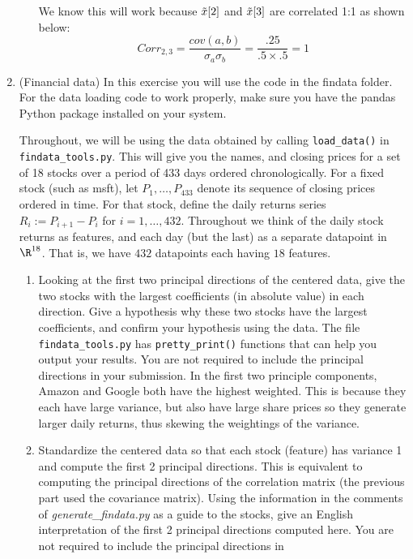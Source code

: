 \documentclass[12pt,twoside]{article}
\newcommand{\rx}{\rnd{ x}  }
\newcommand{\rnd}{\Tilde}
\begin{document}
\begin{enumerate}
\begin{enumerate}
We know this will work because $\rx[2]$ and $\rx[3]$ are correlated 1:1 as shown below:
$$
    Corr_{2,3} = \frac{cov(a,b)}{\sigma_a \sigma_b} = \frac{.25}{.5\times .5} = 1
$$
\end{enumerate}

\item (Financial data) In this exercise you will use the code in the findata folder.
  For the data loading code to work properly, make sure you
  have the pandas Python package installed on your system.

  Throughout, we will be using the data obtained by calling
 \verb|load_data()| in \verb|findata_tools.py|.  This will
  give you the names, and closing prices for a set of 18 stocks over a
  period of 433 days ordered chronologically.
  For a fixed stock (such as msft), let
  $P_1,\ldots,P_{433}$ denote its sequence of closing prices ordered in
  time.  For that stock, define the daily returns series $R_i:=P_{i+1}-P_i$ for
  $i=1,\ldots,432$.  Throughout we think of the daily stock returns as features,
  and each day (but the last) as a separate datapoint in $\R^{18}$.
  That is, we have $432$ datapoints each having $18$ features.
  \begin{enumerate}
  \item Looking at the first two principal directions of the
    centered data, give the two stocks with the largest
    coefficients (in absolute value) in each direction.  
    Give a hypothesis why these two stocks have the largest
    coefficients, and confirm your hypothesis using the data.  The file 
 \verb|findata_tools.py| has \verb|pretty_print()|
    functions that can help you output your results.
    You are not required to include the principal directions in
    your submission.
    \subitem
    In the first two principle components, Amazon and Google both have the highest weighted. This is because they each have large variance, but also have large share prices so they generate larger daily returns, thus skewing the weightings of the variance. 
  \item Standardize the centered data so that each stock (feature) has
    variance 1 and compute the first 2 principal directions.  This is
    equivalent to computing the principal directions of the
    correlation matrix (the previous part used the covariance
    matrix).  Using the information in the comments of
   \emph{generate\_findata.py} as a guide to the stocks, 
    give an English interpretation of the first 2 principal directions
    computed here. 
    You are not required to include the principal directions in

\end{enumerate}
\end{enumerate}
\end{document}
